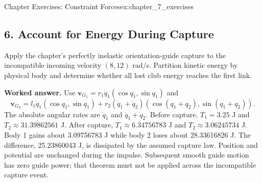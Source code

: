 \begin{exercises}{Chapter Exercises: Constraint Forces}{ex:chapter_7_exercises}
\subsection*{6. Account for Energy During Capture}
Apply the chapter's perfectly inelastic orientation-guide capture to the incompatible incoming velocity $(8,12)$ rad/s. Partition kinetic energy by physical body and determine whether all lost club energy reaches the first link.

\textbf{Worked answer.} Use $\bm v_{G_1}=r_1\dot q_1(\cos q_1,\sin q_1)$ and
\[
\bm v_{G_2}=l_1\dot q_1(\cos q_1,\sin q_1)
+r_2(\dot q_1+\dot q_2)(\cos(q_1+q_2),\sin(q_1+q_2)).
\]
The absolute angular rates are $\dot q_1$ and $\dot q_1+\dot q_2$. Before capture, $T_1=3.25$ J and $T_2\approx31.39862561$ J. After capture, $T_1\approx6.34756783$ J and $T_2\approx3.06245734$ J. Body 1 gains about 3.09756783 J while body 2 loses about 28.33616826 J. The difference, 25.23860043 J, is dissipated by the assumed capture law. Position and potential are unchanged during the impulse. Subsequent smooth guide motion has zero guide power; that theorem must not be applied across the incompatible capture event.

\end{exercises}


\flushbottom{}
